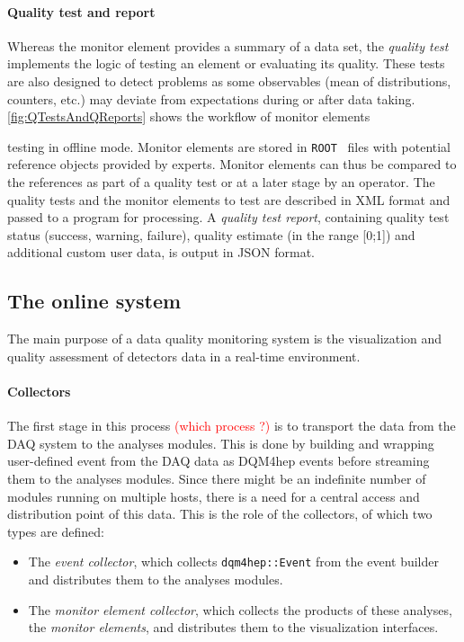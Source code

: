 \documentclass{webofc}
\begin{document}
{\paragraph{Quality test and report}

Whereas the monitor element provides a summary of a data set, the \textit{quality test} implements the logic of testing an element or evaluating its quality.
These tests are also designed to detect problems as some observables (mean of distributions, counters, etc.) may deviate from expectations during or after data taking. \autoref{fig:QTestsAndQReports} shows the workflow of monitor elements 

} %
\noindent testing in offline mode.
Monitor elements are stored in \texttt{ROOT}~\cite{ROOT} files with potential reference objects provided by experts.
Monitor elements can thus be compared to the references as part of a quality test or at a later stage by an operator. 
The quality tests and the monitor elements to test are described in XML format and passed to a program for processing.
A \textit{quality test report}, containing quality test status (success, warning, failure), quality estimate (in the range [0;1]) and additional custom user data, is output in JSON format.

\subsection{The online system}
\label{subsec:online}
The main purpose of a data quality monitoring system is the visualization and quality assessment of detectors data in a real-time environment.

\paragraph{Collectors}\label{par:Collectors}
The first stage in this process \textcolor{red}{(which process ?)} is to transport the data from the DAQ system to the analyses modules.
This is done by building and wrapping user-defined event from the DAQ data as DQM4hep events before streaming them to the analyses modules.
Since there might be an indefinite number of modules running on multiple hosts, there is a need for a central access and distribution point of this data. This is the role of the collectors, of which two types are defined:

\begin{itemize}
  \item The \textit{event collector}, which collects \texttt{dqm4hep::Event} from the event builder and distributes them to the analyses modules. 
  \item The \textit{monitor element collector}, which collects the products of these analyses, the \textit{monitor elements}, and distributes them to the visualization interfaces.
\end{itemize}
\end{document}

